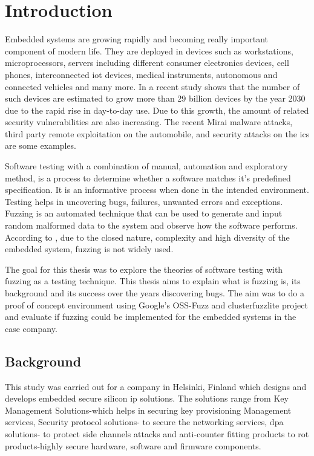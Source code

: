 
\chapter{Introduction}

Embedded systems are growing rapidly and becoming really important component of modern life. They
are deployed in devices such as workstations, microprocessors, servers including different consumer
electronics devices, cell phones, interconnected \gls{iot} devices, medical instruments,
autonomous and connected vehicles and many more\cite{camposano1996embedded:ARTICLE}. In a recent study
shows\cite{IoTconne16:online} that the number of such devices are estimated to grow more than
29 billion devices by the year 2030 due to the rapid rise in day-to-day use. Due to this growth, the
amount of related security vulnerabilities are also increasing. The recent Mirai malware attacks,
third party remote exploitation on the automobile, and security attacks on the \gls{ics} are some
examples\cite{muench2018you}.\newline

Software testing with a combination of manual, automation and exploratory method, is a process to
determine whether a software matches it's predefined specification. It is an informative process
when done in the intended environment. Testing helps in uncovering bugs, failures, unwanted errors and
exceptions\cite{819971}. Fuzzing is an automated technique that can be used to generate and input
random malformed data to the system and observe how the software performs\cite{9787842}.
According to \citeauthor{9787842}, due to the closed nature, complexity and high diversity of the
embedded system, fuzzing is not widely used.\newline

The goal for this thesis was to explore the theories of software testing with fuzzing as a testing
technique. This thesis aims to explain what is fuzzing is, its background and its success over the
years discovering bugs. The aim was to do a proof of concept environment using
Google's OSS-Fuzz\cite{GitHubgo49:online} and clusterfuzzlite\cite{ClusterF90:online} project and
evaluate if fuzzing could be implemented for the embedded systems in the case company.\newline

\section{Background}
This study was carried out for a company in Helsinki, Finland which designs and develops embedded secure
silicon \gls{ip} solutions. The solutions range from Key Management Solutions-which helps in securing
key provisioning Management services, Security protocol solutions- to secure the networking services,
\gls{dpa} solutions- to protect side channels attacks and anti-counter fitting products
to \gls{rot} products-highly secure hardware, software and firmware components. \newline


